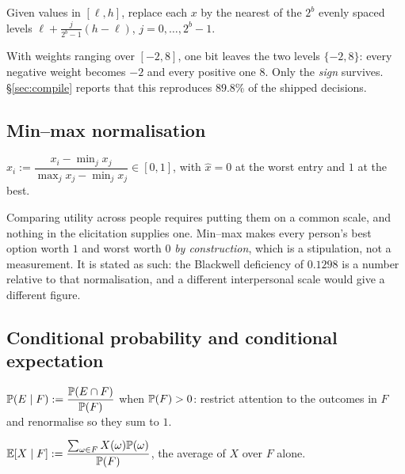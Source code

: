 \begin{definition}
Given values in $[\ell,h]$, replace each $x$ by the nearest of the $2^b$ evenly
spaced levels $\ell + \tfrac{j}{2^b-1}(h-\ell)$, $j=0,\dots,2^b-1$.
\end{definition}

 With weights ranging over $[-2,8]$, one bit leaves the
two levels $\{-2, 8\}$: every negative weight becomes $-2$ and every positive one
$8$. Only the \emph{sign} survives. §\ref{sec:compile} reports that this
reproduces $89.8\%$ of the shipped decisions.

\subsection{Min--max normalisation}

\begin{definition}
$\hat x_i := \dfrac{x_i - \min_j x_j}{\max_j x_j - \min_j x_j} \in [0,1]$,
with $\hat x = 0$ at the worst entry and $1$ at the best.
\end{definition}

 Comparing utility across
people requires putting them on a common scale, and nothing in the elicitation
supplies one. Min--max makes every person's best option worth $1$ and worst worth
$0$ \emph{by construction}, which is a stipulation, not a measurement. It is
stated as such: the Blackwell deficiency of $0.1298$ is a number relative to that
normalisation, and a different interpersonal scale would give a different figure.

\subsection{Conditional probability and conditional expectation}

\begin{definition}
$\mathbb{P}(E\mid F) := \dfrac{\mathbb{P}(E\cap F)}{\mathbb{P}(F)}$ when $\mathbb{P}(F)>0$:
restrict attention to the outcomes in $F$ and renormalise so they sum to $1$.
\end{definition}

\begin{definition}
$\mathbb{E}[X \mid F] := \dfrac{\sum_{\omega\in F} X(\omega)\mathbb{P}(\omega)}{\mathbb{P}(F)}$,
the average of $X$ over $F$ alone.
\end{definition}

